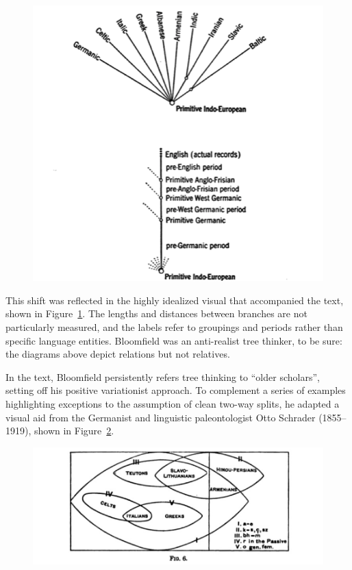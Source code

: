 \documentclass[output=paper]{langscibook}
\begin{document}
\begin{figure}
    \centering
    \includegraphics[scale=1]{figures/bloomfiield1933.png}
    \caption{\citet[312]{Bloomfield1933}}
    \label{fig:kaplan:bloomfield}
\end{figure}

This shift was reflected in the highly idealized visual that accompanied the text, shown in Figure~\ref{fig:kaplan:bloomfield}. The lengths and distances between branches are not particularly measured, and the labels refer to groupings and periods rather than specific language entities. Bloomfield was an anti-realist tree thinker, to be sure: the diagrams above depict relations but not relatives.

In the text, Bloomfield persistently refers tree thinking to ``older scholars'', setting off his positive variationist approach. To complement a series of examples highlighting exceptions to the assumption of clean two-way splits, he adapted a visual aid from the Germanist and linguistic paleontologist Otto Schrader (1855--1919), shown in Figure~\ref{fig:kaplan:schrader}.

\begin{figure}
    \centering
    \includegraphics[scale=0.8]{figures/schrader1890.png}
    \caption{\citet[65]{Schrader1890}}
    \label{fig:kaplan:schrader}
\end{figure}
\end{document}
